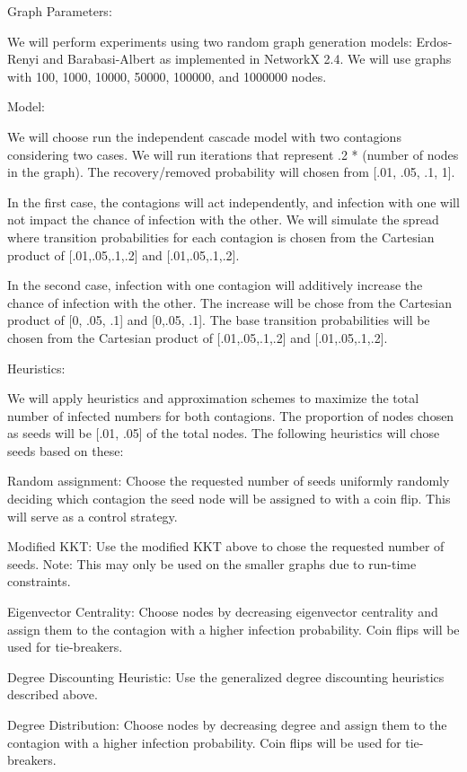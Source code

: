\documentclass[11pt]{article}
\begin{document}
Graph Parameters:

We will perform experiments using two random graph generation models: Erdos-Renyi and Barabasi-Albert as implemented in NetworkX 2.4. 
We will use graphs with 100, 1000, 10000, 50000, 100000, and 1000000 nodes.


Model:


We will choose run the independent cascade model with two contagions considering two cases. We will run iterations that represent .2 * (number of nodes in the graph). The recovery/removed probability will chosen from [.01, .05, .1, 1].


In the first case, the contagions will act independently, and infection with one will not impact the chance of infection with the other. We will simulate the spread where transition probabilities for each contagion is chosen from the Cartesian product of [.01,.05,.1,.2] and [.01,.05,.1,.2].  


In the second case, infection with one contagion will additively increase the chance of infection with the other. The increase will be chose from the Cartesian product of [0, .05, .1] and [0,.05, .1]. The base transition probabilities will be chosen from the Cartesian product of [.01,.05,.1,.2] and [.01,.05,.1,.2].


Heuristics:


We will apply heuristics and approximation schemes to maximize the total number of infected numbers for both contagions. The proportion of nodes chosen as seeds will be [.01, .05] of the total nodes. The following heuristics will chose seeds based on these:


Random assignment: Choose the requested number of seeds uniformly randomly deciding which contagion the seed node will be assigned to with a coin flip. This will serve as a control strategy.


Modified KKT: Use the modified KKT above to chose the requested number of seeds. Note: This may only be used on the smaller graphs due to run-time constraints.


Eigenvector Centrality: Choose nodes by decreasing eigenvector centrality and assign them to the contagion with a higher infection probability. Coin flips will be used for tie-breakers. 


Degree Discounting Heuristic: Use the generalized degree discounting heuristics described above.


Degree Distribution: Choose nodes by decreasing degree and assign them to the contagion with a higher infection probability. Coin flips will be used for tie-breakers.
\end{document}
